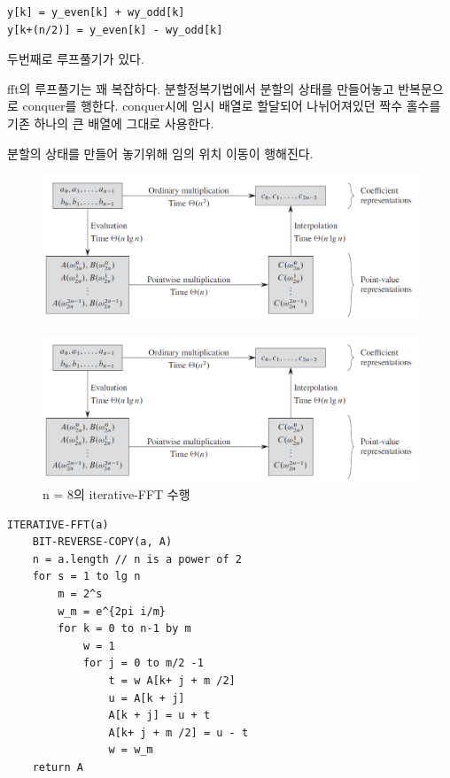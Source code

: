 \documentclass{oblivoir}
\begin{document}
\begin{lstlisting}[style = CStyle]
y[k] = y_even[k] + wy_odd[k]
y[k+(n/2)] = y_even[k] - wy_odd[k]
\end{lstlisting}

두번째로 루프풀기가 있다.

fft의 루프풀기는 꽤 복잡하다.
분할정복기법에서 분할의 상태를 만들어놓고 반복문으로 conquer를 행한다.
conquer시에 임시 배열로 할달되어 나뉘어져있던 짝수 홀수를 기존 하나의 큰 배열에 그대로 사용한다.


분할의 상태를 만들어 놓기위해 임의 위치 이동이 행해진다.

\begin{figure}[h!]
    \centering
    \includegraphics[scale=0.5]{pic1.PNG}
\end{figure}


\begin{figure}[h!]
    \centering
    \includegraphics[scale=0.5]{pic1.PNG}
    \caption{n = 8의 iterative-FFT 수행}
\end{figure}



\begin{lstlisting}[style = CStyle]
ITERATIVE-FFT(a)
    BIT-REVERSE-COPY(a, A)
    n = a.length // n is a power of 2
    for s = 1 to lg n
        m = 2^s
        w_m = e^{2pi i/m}
        for k = 0 to n-1 by m
            w = 1
            for j = 0 to m/2 -1
                t = w A[k+ j + m /2]
                u = A[k + j]
                A[k + j] = u + t
                A[k+ j + m /2] = u - t
                w = w_m
    return A
\end{lstlisting}
\end{document}

